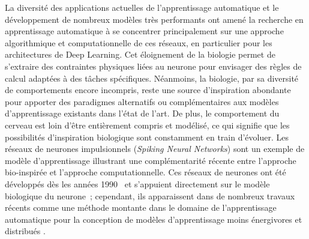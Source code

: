 La diversité des applications actuelles de l'apprentissage automatique et le développement de nombreux modèles très performants ont amené la recherche en apprentissage automatique à se concentrer principalement sur une approche algorithmique et computationnelle de ces réseaux, en particulier pour les architectures de Deep Learning.
Cet éloignement de la biologie permet de s'extraire des contraintes physiques liées au neurone pour envisager des règles de calcul adaptées à des tâches spécifiques.
Néanmoins, la biologie, par sa diversité de comportements encore incompris, reste une source d'inspiration abondante pour apporter des paradigmes alternatifs ou complémentaires aux modèles d'apprentissage existants dans l'état de l'art. De plus, le comportement du cerveau est loin d'être entièrement compris et modélisé, ce qui signifie que les possibilités d'inspiration biologique sont constamment en train d'évoluer.
Les réseaux de neurones impulsionnels (\emph{Spiking Neural Networks}) sont un exemple de modèle d'apprentissage illustrant une complémentarité récente entre l'approche bio-inspirée et l'approche computationnelle.
Ces réseaux de neurones ont été développés dès les années 1990~\cite{Maass1996NetworksOS} et s'appuient directement sur le modèle biologique du neurone~; cependant, ils apparaissent dans de nombreux travaux récents comme une méthode montante dans le domaine de l'apprentissage automatique pour la conception de modèles d'apprentissage moins énergivores et distribués \cite{Yamazaki2022SpikingNN}.

